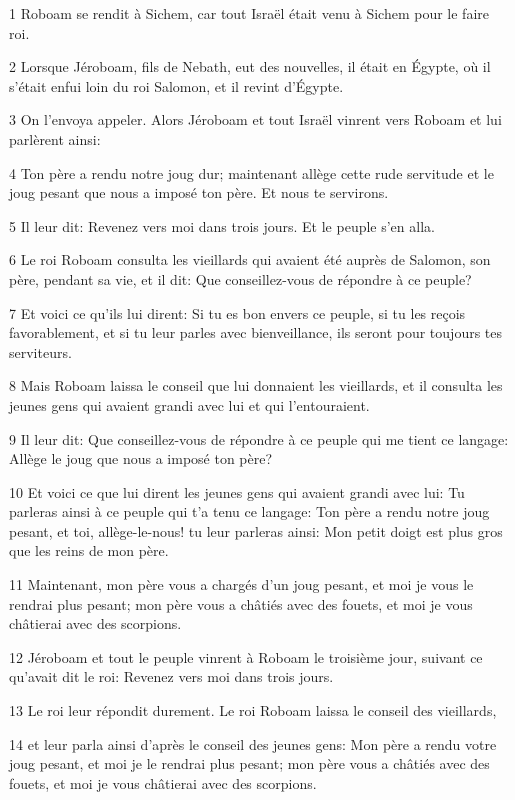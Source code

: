 \par 1 Roboam se rendit à Sichem, car tout Israël était venu à Sichem pour le faire roi.
\par 2 Lorsque Jéroboam, fils de Nebath, eut des nouvelles, il était en Égypte, où il s'était enfui loin du roi Salomon, et il revint d'Égypte.
\par 3 On l'envoya appeler. Alors Jéroboam et tout Israël vinrent vers Roboam et lui parlèrent ainsi:
\par 4 Ton père a rendu notre joug dur; maintenant allège cette rude servitude et le joug pesant que nous a imposé ton père. Et nous te servirons.
\par 5 Il leur dit: Revenez vers moi dans trois jours. Et le peuple s'en alla.
\par 6 Le roi Roboam consulta les vieillards qui avaient été auprès de Salomon, son père, pendant sa vie, et il dit: Que conseillez-vous de répondre à ce peuple?
\par 7 Et voici ce qu'ils lui dirent: Si tu es bon envers ce peuple, si tu les reçois favorablement, et si tu leur parles avec bienveillance, ils seront pour toujours tes serviteurs.
\par 8 Mais Roboam laissa le conseil que lui donnaient les vieillards, et il consulta les jeunes gens qui avaient grandi avec lui et qui l'entouraient.
\par 9 Il leur dit: Que conseillez-vous de répondre à ce peuple qui me tient ce langage: Allège le joug que nous a imposé ton père?
\par 10 Et voici ce que lui dirent les jeunes gens qui avaient grandi avec lui: Tu parleras ainsi à ce peuple qui t'a tenu ce langage: Ton père a rendu notre joug pesant, et toi, allège-le-nous! tu leur parleras ainsi: Mon petit doigt est plus gros que les reins de mon père.
\par 11 Maintenant, mon père vous a chargés d'un joug pesant, et moi je vous le rendrai plus pesant; mon père vous a châtiés avec des fouets, et moi je vous châtierai avec des scorpions.
\par 12 Jéroboam et tout le peuple vinrent à Roboam le troisième jour, suivant ce qu'avait dit le roi: Revenez vers moi dans trois jours.
\par 13 Le roi leur répondit durement. Le roi Roboam laissa le conseil des vieillards,
\par 14 et leur parla ainsi d'après le conseil des jeunes gens: Mon père a rendu votre joug pesant, et moi je le rendrai plus pesant; mon père vous a châtiés avec des fouets, et moi je vous châtierai avec des scorpions.
